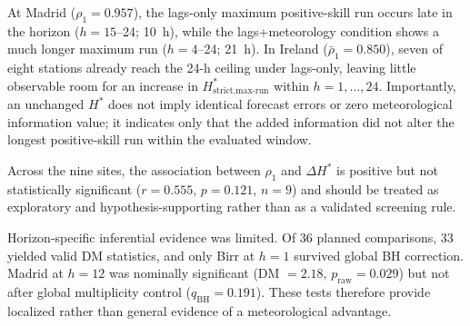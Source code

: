 \documentclass[12pt,a4paper]{article}
\begin{document}
At Madrid ($\rho_1 = 0.957$), the lags-only maximum positive-skill run occurs
late in the horizon ($h=15$--24; 10~h), while the lags+meteorology condition
shows a much longer maximum run ($h=4$--24; 21~h).  In Ireland
($\bar{\rho}_1=0.850$), seven of eight stations already reach the 24-h ceiling
under lags-only, leaving little observable room for an increase in
$H^*_{\text{strict,max-run}}$ within $h=1,\ldots,24$.  Importantly, an unchanged
$H^*$ does not imply identical forecast errors or zero meteorological
information value; it indicates only that the added information did not alter
the longest positive-skill run within the evaluated window.

Across the nine sites, the association between $\rho_1$ and $\Delta H^*$ is
positive but not statistically significant ($r = 0.555$, $p = 0.121$, $n = 9$)
and should be treated as exploratory and hypothesis-supporting rather than as a
validated screening rule.

Horizon-specific inferential evidence was limited. Of 36 planned
comparisons, 33 yielded valid DM statistics, and only Birr at $h=1$
survived global BH correction. Madrid at $h=12$ was nominally significant
(DM $=2.18$, $p_{\mathrm{raw}}=0.029$) but not after global multiplicity
control ($q_{\mathrm{BH}}=0.191$). These tests therefore provide localized
rather than general evidence of a meteorological advantage.
\end{document}

